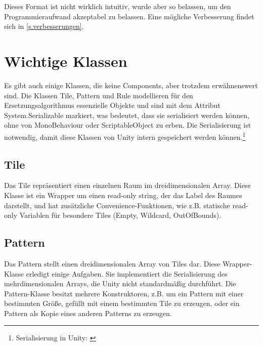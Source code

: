 
Dieses Format ist nicht wirklich intuitiv, wurde aber so belassen, um den Programmieraufwand akzeptabel zu belassen. Eine mögliche Verbesserung findet sich in \ref{s.verbesserungen}. 


\section{Wichtige Klassen}

Es gibt auch einige Klassen, die keine Components, aber trotzdem erwähnenswert sind. Die Klassen Tile, Pattern und Rule modellieren für den Ersetzungsalgorithmus essenzielle Objekte und sind mit dem Attribut System.Serializable markiert, was bedeutet, dass sie serialisiert werden können, ohne von MonoBehaviour oder ScriptableObject zu erben. Die Serialisierung ist notwendig, damit diese Klassen von Unity intern gespeichert werden können.\footnote{Serialisierung in Unity: \cite[Seite: script-Serialization]{unityManual}}

\subsection{Tile}

Das Tile repräsentiert einen einzelnen Raum im dreidimensionalen Array. Diese Klasse ist ein Wrapper um einen read-only string, der das Label des Raumes darstellt, und hat zusätzliche Convenience-Funktionen, wie z.B. statische read-only Variablen für besondere Tiles (Empty, Wildcard, OutOfBounds).

\subsection{Pattern}

Das Pattern stellt einen dreidimensionalen Array von Tiles dar. Diese Wrapper-Klasse erledigt einige Aufgaben. Sie implementiert die Serialisierung des mehrdimensionalen Arrays, die Unity nicht standardmäßig durchführt. Die Pattern-Klasse besitzt mehrere Konstruktoren, z.B. um ein Pattern mit einer bestimmten Größe, gefüllt mit einem bestimmten Tile zu erzeugen, oder ein Pattern als Kopie eines anderen Patterns zu erzeugen. 

